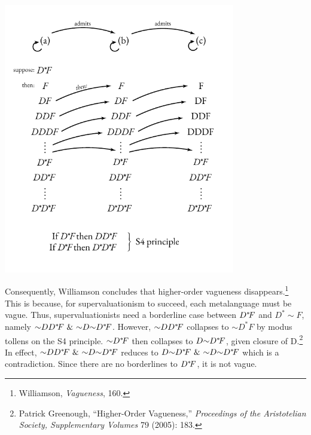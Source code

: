 \begin{center}
\includegraphics[width=3.97674in,height=4.66543in]{papers/figures/2-1.pdf}
\end{center}
Consequently, Williamson concludes that higher-order vagueness
disappears.\footnote{Williamson, \emph{Vagueness}, 160.} This is
because, for supervaluationism to succeed, each metalanguage must be
vague. Thus, supervaluationists need a borderline case between
$D^*\hspace{-0.2em}F$ and $D^*{\sim}F$, namely
${\sim}DD^*\hspace{-0.2em}F \ \& \ {\sim}D{\sim}D^*\hspace{-0.2em}F$. However, ${\sim}DD^*\hspace{-0.2em}F$
collapses to ${{\sim}D}^{*}F$ by modus tollens on the S4 principle. ${\sim}D^*\hspace{-0.2em}F$ then collapses to $D {\sim}D^*\hspace{-0.2em}F$, given closure of
D.\footnote{Patrick Greenough, ``Higher-Order Vagueness,''
  \emph{Proceedings of the Aristotelian Society, Supplementary Volumes}
  79 (2005): 183.}
In effect, ${\sim}DD^*\hspace{-0.2em}F \ \& \ {\sim}D{\sim}D^*\hspace{-0.2em}F$ reduces to $D{\sim}D^*\hspace{-0.2em}F \ \& \ {\sim}D{\sim}D^*\hspace{-0.2em}F$ which is a contradiction.
Since there are no borderlines to $D^*\hspace{-0.2em}F$, it is not vague.

